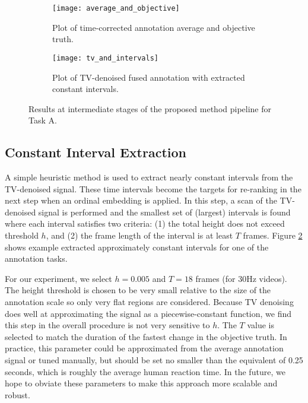 \documentclass[times,twocolumn,final,authoryear]{elsarticle}
\begin{document}
\begin{figure*}
	\centering
	\begin{subfigure}{0.49\textwidth}
	\texttt{[image: average\_and\_objective]}
	\caption{Plot of time-corrected annotation average and objective truth.}
	\label{fig:average_and_objective}
	\end{subfigure}
	\begin{subfigure}{0.49\textwidth}
	\texttt{[image: tv\_and\_intervals]}
	\caption{Plot of TV-denoised fused annotation with extracted constant intervals.}
	\label{fig:tv_and_intervals}
	\end{subfigure}
	\caption{Results at intermediate stages of the proposed method pipeline for Task A.}
	\label{fig:average_and_objective_and_tv}
\end{figure*}

\subsection{Constant Interval Extraction}
A simple heuristic method is used to extract nearly constant intervals from the TV-denoised signal.  These time intervals become the targets for re-ranking in the next step when an ordinal embedding is applied.  In this step, a scan of the TV-denoised signal is performed and the smallest set of (largest) intervals is found where each interval satisfies two criteria: (1) the total height does not exceed threshold $h$, and (2) the frame length of the interval is at least $T$ frames.  Figure \ref{fig:tv_and_intervals} shows example extracted approximately constant intervals for one of the annotation tasks.

For our experiment, we select $h=0.005$ and $T=18$ frames (for 30Hz videos).  The height threshold is chosen to be very small relative to the size of the annotation scale so only very flat regions are considered.  Because TV denoising does well at approximating the signal as a piecewise-constant function, we find this step in the overall procedure is not very sensitive to $h$.  The $T$ value is selected to match the duration of the fastest change in the objective truth.  In practice, this parameter could be approximated from the average annotation signal or tuned manually, but should be set no smaller than the equivalent of 0.25 seconds, which is roughly the average human reaction time.  In the future, we hope to obviate these parameters to make this approach more scalable and robust.
\end{document}
